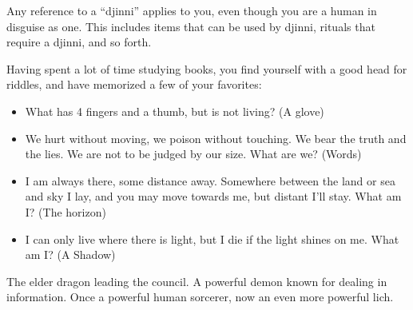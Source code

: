 \documentclass[char]{guildcamp2}
\begin{document}
\begin{itemz}[Notes]
\item Any reference to a ``djinni'' applies to you, even though you are a human in disguise as one. This includes items that can be used by djinni, rituals that require a djinni, and so forth.
\item Having spent a lot of time studying books, you find yourself with a good head for riddles, and have memorized a few of your favorites:
\begin{itemize}
	\item What has 4 fingers and a thumb, but is not living? (A glove)
	\item We hurt without moving, we poison without touching.  We bear the truth and the lies.  We are not to be judged by our size.  What are we?  (Words)
	\item I am always there, some distance away.  Somewhere between the land or sea and sky I lay, and you may move towards me, but distant I'll stay.  What am I?  (The horizon)
	\item I can only live where there is light, but I die if the light shines on me.  What am I?  (A Shadow)
\end{itemize}
\end{itemz}

\begin{contacts}
  \contact{\cOnyx{}} The elder dragon leading the council.
  \contact{\cDemon{}} A powerful demon known for dealing in information.
  \contact{\cLich{}} Once a powerful human sorcerer, now an even more powerful lich.
\end{contacts}
\end{document}

